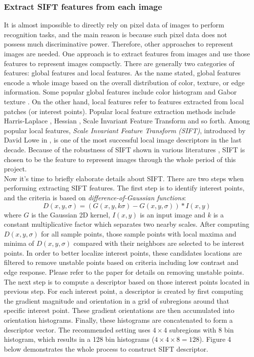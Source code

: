 \subsubsection{Extract SIFT features from each image}
It is almost impossible to directly rely on pixel data of images to perform recognition tasks, and the main reason is because such pixel data does not possess much discriminative power. Therefore, other approaches to represent images are needed. One approach is to extract features from images and use those features to represent images compactly. There are generally two categories of features: global features and local features. As the name stated, global features encode a whole image based on the overall distribution of color, texture, or edge information. Some popular global features include color histogram and Gabor texture \cite{manjunath1996texture}. On the other hand, local features refer to features extracted from local patches (or interest points). Popular local feature extraction methods include Harris-Laplace \cite{lindeberg1998feature}, Hessian \cite{mikolajczyk2004scale}, Scale Invariant Feature Transform \cite{lowe1999object} and so forth. Among popular local features, {\em Scale Invariant Feature Transform (SIFT)}, introduced by David Lowe in \cite{lowe1999object}, is one of the most successful local image descriptors in the last decade. Because of the robustness of SIFT shown in various literatures \cite{lowe1999object,duan2012visual,zhou2008sift}, SIFT is chosen to be the feature to represent images through the whole period of this project.\\

\noindent Now it's time to briefly elaborate details about SIFT. There are two steps when performing extracting SIFT features. The first step is to identify interest points, and the criteria is based on {\em difference-of-Gaussian functions}:
$$D(x, y, \sigma) = (G(x, y, k\sigma) - G(x, y, \sigma)) * I(x, y)$$
where $G$ is the Gaussian 2D kernel, $I(x, y)$ is an input image and $k$ is a constant multiplicative factor which separates two nearby scales. After computing $D(x, y, \sigma)$ for all sample points, those sample points with local maxima and minima of $D(x, y, \sigma)$ compared with their neighbors are selected to be interest points. In order to better localize interest points, these candidates locations are filtered to remove unstable points based on criteria including low contrast and edge response. Please refer to the paper \cite{lowe2004distinctive} for details on removing unstable points. The next step is to compute a descriptor based on those interest points located in previous step. For each interest point, a descriptor is created by first computing the gradient magnitude and orientation in a grid of subregions around that specific interest point. These gradient orientations are then accumulated into orientation histograms. Finally, these histograms are concatenated to form a descriptor vector. The recommended setting uses $4 \times 4$ subregions with 8 bin histogram, which results in a 128 bin histograms ($4 \times 4 \times 8 = 128$). Figure 4 below demonstrates the whole process to construct SIFT descriptor. \\

